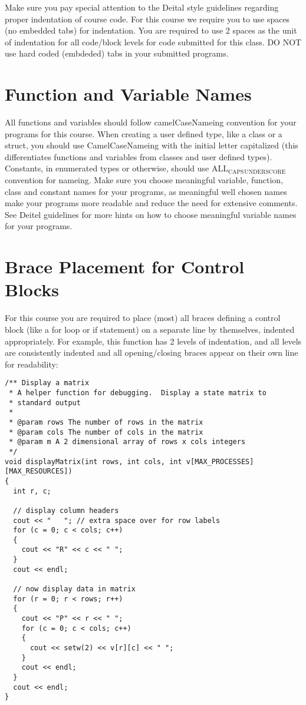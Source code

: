 \documentclass[11pt]{article}
\begin{document}
Make sure you pay special attention to the Deital style guidelines
regarding proper indentation of course code.  For this course we
require you to use spaces (no embedded tabs) for indentation.  You are
required to use 2 spaces as the unit of indentation for all code/block
levels for code submitted for this class.  DO NOT use hard coded
(embdeded) tabs in your submitted programs.
\section*{Function and Variable Names}
\label{sec-5}


All functions and variables should follow camelCaseNameing convention
for your programs for this course.  When creating a user defined type,
like a class or a struct, you should use CamelCaseNameing with the
initial letter capitalized (this differentiates functions and
variables from classes and user defined types). Constants, in
enumerated types or otherwise, should use ALL$_{\mathrm{CAPS}}$$_{\mathrm{UNDERSCORE}}$
convention for nameing.  Make sure you choose meaningful variable,
function, class and constant names for your programs, as meaningful
well chosen names make your programs more readable and reduce the need
for extensive comments.  See Deitel guidelines for more hints on how
to choose meaningful variable names for your programs.
\section*{Brace Placement for Control Blocks}
\label{sec-6}


For this course you are required to place (most) all braces defining a
control block (like a for loop or if statement) on a separate line by
themselves, indented appropriately.  For example, this function has 2
levels of indentation, and all levels are consistently indented and
all opening/closing braces appear on their own line for readability:


\begin{verbatim}
/** Display a matrix
 * A helper function for debugging.  Display a state matrix to
 * standard output
 *
 * @param rows The number of rows in the matrix
 * @param cols The number of cols in the matrix
 * @param m A 2 dimensional array of rows x cols integers
 */
void displayMatrix(int rows, int cols, int v[MAX_PROCESSES][MAX_RESOURCES])
{
  int r, c;

  // display column headers
  cout << "   "; // extra space over for row labels
  for (c = 0; c < cols; c++)
  {
    cout << "R" << c << " ";
  }
  cout << endl;

  // now display data in matrix
  for (r = 0; r < rows; r++)
  {
    cout << "P" << r << " ";
    for (c = 0; c < cols; c++)
    {
      cout << setw(2) << v[r][c] << " ";
    }
    cout << endl;
  }
  cout << endl;
}
\end{verbatim}
\end{document}
